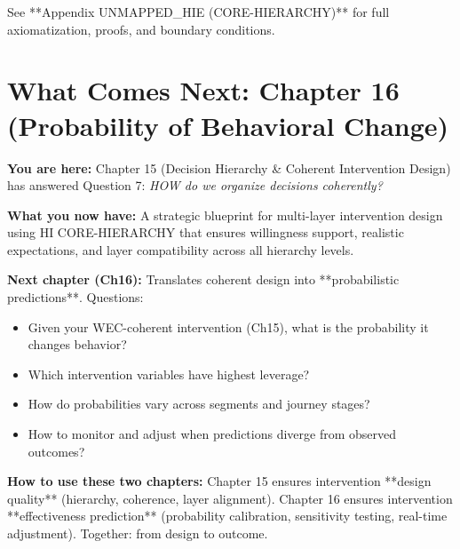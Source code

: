 \documentclass[11pt, a4paper]{article}
\begin{document}
See **Appendix UNMAPPED_HIE (CORE-HIERARCHY)** for full axiomatization, proofs, and boundary conditions.


\section{What Comes Next: Chapter 16 (Probability of Behavioral Change)}\label{sec:ch15-what-next}

\begin{tcolorbox}[colback=green!10!white, colframe=green!75!black, title=Reading Path: To Chapter 16 (Probability of Behavioral Change)]

\textbf{You are here:} Chapter 15 (Decision Hierarchy \& Coherent Intervention Design) has answered Question 7: \textit{HOW do we organize decisions coherently?}

\textbf{What you now have:} A strategic blueprint for multi-layer intervention design using HI CORE-HIERARCHY that ensures willingness support, realistic expectations, and layer compatibility across all hierarchy levels.

\textbf{Next chapter (Ch16):} Translates coherent design into **probabilistic predictions**. Questions:
\begin{itemize}[nosep]
    \item Given your WEC-coherent intervention (Ch15), what is the probability it changes behavior?
    \item Which intervention variables have highest leverage?
    \item How do probabilities vary across segments and journey stages?
    \item How to monitor and adjust when predictions diverge from observed outcomes?
\end{itemize}

\textbf{How to use these two chapters:} Chapter 15 ensures intervention **design quality** (hierarchy, coherence, layer alignment). Chapter 16 ensures intervention **effectiveness prediction** (probability calibration, sensitivity testing, real-time adjustment). Together: from design to outcome.

\end{tcolorbox}

\end{document}
